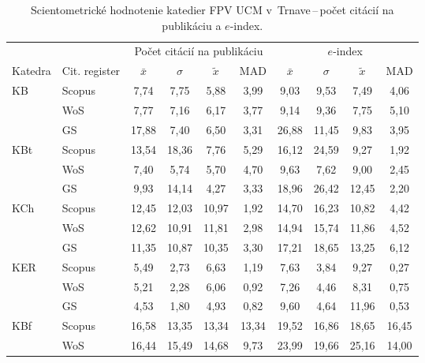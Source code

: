 \begin{table}
  \centering\small
  \caption[Hodnotenie FPV\,--\,počet citácií na publikáciu a $e$-index]%
  {Scientometrické hodnotenie katedier FPV UCM v~Trnave\,--\,počet citácií na publikáciu a $e$-index.}
  \label{tab:2-staff.results}
  \begin{tabularx}{\textwidth}{XXcccc@{\hspace{3ex}}cccc}
    \toprule\noalign{\vspace{.3ex}}
    & & \multicolumn{4}{c}{Počet citácií na publikáciu} & \multicolumn{4}{c}{$e$-index} \\
    \cmidrule{3-6}\cmidrule{7-10}
    Katedra  & Cit. register & $\bar{x}$ & $\sigma$  & $\tilde{x}$ & MAD & $\bar{x}$ & $\sigma$ & $\tilde{x}$  & MAD \\[0.3ex]
    \midrule\noalign{\vspace{.5ex}}
    KB   & Scopus & 7,74  & 7,75  & 5,88  & 3,99  & 9,03  & 9,53  & 7,49  & 4,06  \\
         & WoS    & 7,77  & 7,16  & 6,17  & 3,77  & 9,14  & 9,36  & 7,75  & 5,10  \\
         & GS     & 17,88 & 7,40  & 6,50  & 3,31  & 26,88 & 11,45 & 9,83  & 3,95  \\[3ex]
    KBt  & Scopus & 13,54 & 18,36 & 7,76  & 5,29  & 16,12 & 24,59 & 9,27  & 1,92  \\
         & WoS    & 7,40  & 5,74  & 5,70  & 4,70  & 9,63  & 7,62  & 9,00  & 2,45  \\
         & GS     & 9,93  & 14,14 & 4,27  & 3,33  & 18,96 & 26,42 & 12,45 & 2,20  \\[3ex]
    KCh  & Scopus & 12,45 & 12,03 & 10,97 & 1,92  & 14,70 & 16,23 & 10,82 & 4,42  \\
         & WoS    & 12,62 & 10,91 & 11,81 & 2,98  & 14,94 & 15,74 & 11,86 & 4,52  \\
         & GS     & 11,35 & 10,87 & 10,35 & 3,30  & 17,21 & 18,65 & 13,25 & 6,12  \\[3ex]
    KER  & Scopus & 5,49  & 2,73  & 6,63  & 1,19  & 7,63  & 3,84  & 9,27  & 0,27  \\
         & WoS    & 5,21  & 2,28  & 6,06  & 0,92  & 7,26  & 4,46  & 8,31  & 0,75  \\
         & GS     & 4,53  & 1,80  & 4,93  & 0,82  & 9,60  & 4,64  & 11,96 & 0,53  \\[3ex]
    KBf  & Scopus & 16,58 & 13,35 & 13,34 & 13,34 & 19,52 & 16,86 & 18,65 & 16,45 \\
         & WoS    & 16,44 & 15,49 & 14,68 & 9,73  & 23,99 & 19,66 & 25,16 & 14,00 \\

\end{tabularx}
\end{table}
